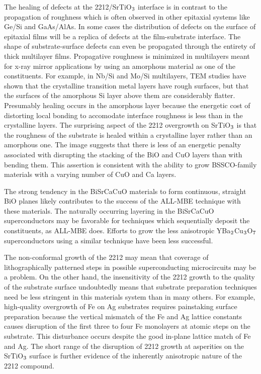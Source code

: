 The healing of defects at the 2212/SrTiO$\rm _3$ interface is in
contrast to the propagation of roughness which is often observed in
other epitaxial systems like Ge/Si\cite{headrick} and
GaAs/AlAs.\cite{sinha} In some cases the distribution of defects on
the surface of epitaxial films will be a replica of defects at the
film-substrate interface.  The shape of substrate-surface defects can
even be propagated through the entirety of thick multilayer
films.\cite{sinha} Propagative roughness is minimized in multilayers
meant for x-ray mirror applications by using an amorphous material as
one of the constituents.  For example, in Nb/Si and Mo/Si multilayers,
TEM studies have shown that the crystalline transition metal layers
have rough surfaces, but that the surfaces of the amorphous Si layer
above them are considerably flatter.\cite{chen} Presumably healing
occurs in the amorphous layer because the energetic cost of distorting
local bonding to accomodate interface roughness is less than in the
crystalline layers.  The surprising aspect of the 2212 overgrowth on
SrTiO$\rm _3$ is that the roughness of the substrate is healed within
a crystalline layer rather than an amorphous one.  The image suggests
that there is less of an energetic penalty associated with disrupting
the stacking of the BiO and CuO layers than with bending them.  This
assertion is consistent with the ability to grow BSSCO-family
materials with a varying number of CuO and Ca layers.

The strong tendency in the BiSrCaCuO materials to form continuous,
straight BiO planes likely contributes to the success of the ALL-MBE
technique with these materials. The naturally occurring layering in
the BiSrCaCuO superconductors may be favorable for techniques which
sequentially deposit the constituents, as ALL-MBE does.  Efforts to
grow the less anisotropic YBa$\rm _2$Cu$\rm _3$O$\rm _7$
superconductors using a similar technique have been less
successful.\cite{berkley}

The non-conformal growth of the 2212 may mean that coverage of
lithographically patterned steps in possible superconducting
microcircuits may be a problem.  On the other hand, the insensitivity
of the 2212 growth to the quality of the substrate surface undoubtedly
means that substrate preparation techniques need be less stringent in
this materials system than in many others.  For example, high-quality
overgrowth of Fe on Ag substrates requires painstaking surface
preparation because the vertical mismatch of the Fe and Ag lattice
constants causes disruption of the first three to four Fe monolayers
at atomic steps on the substrate.\cite{heinrich} This disturbance
occurs despite the good in-plane lattice match of Fe and Ag.  The
short range of the disruption of 2212 growth at asperities on the
SrTiO$\rm _3$ surface is further evidence of the inherently
anisotropic nature of the 2212 compound.


